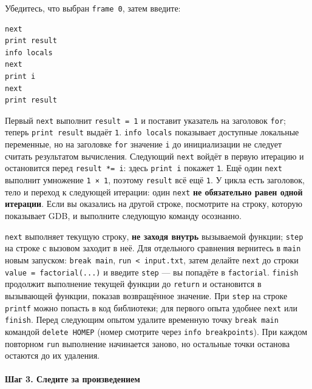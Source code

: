 Убедитесь, что выбран \texttt{frame\ 0}, затем введите:

\begin{verbatim}
next
print result
info locals
next
print i
next
print result
\end{verbatim}

Первый \texttt{next} выполнит \texttt{result\ =\ 1} и поставит указатель
на заголовок \texttt{for}; теперь \texttt{print\ result} выдаёт
\texttt{1}. \texttt{info\ locals} показывает доступные локальные
переменные, но на заголовке \texttt{for} значение \texttt{i} до
инициализации не следует считать результатом вычисления. Следующий
\texttt{next} войдёт в первую итерацию и остановится перед
\texttt{result\ *=\ i}: здесь \texttt{print\ i} покажет \texttt{1}. Ещё
один \texttt{next} выполнит умножение \texttt{1\ ×\ 1}, поэтому
\texttt{result} всё ещё \texttt{1}. У цикла есть заголовок, тело и
переход к следующей итерации: один \texttt{next} \textbf{не обязательно
равен одной итерации}. Если вы оказались на другой строке, посмотрите на
строку, которую показывает GDB, и выполните следующую команду осознанно.

\texttt{next} выполняет текущую строку, \textbf{не заходя внутрь}
вызываемой функции; \texttt{step} на строке с вызовом заходит в неё. Для
отдельного сравнения вернитесь в \texttt{main} новым запуском:
\texttt{break\ main}, \texttt{run\ \textless{}\ input.txt}, затем
делайте \texttt{next} до строки \texttt{value\ =\ factorial(...)} и
введите \texttt{step} --- вы попадёте в \texttt{factorial}.
\texttt{finish} продолжит выполнение текущей функции до \texttt{return}
и остановится в вызывающей функции, показав возвращённое значение. При
\texttt{step} на строке \texttt{printf} можно попасть в код библиотеки;
для первого опыта удобнее \texttt{next} или \texttt{finish}. Перед
следующим опытом удалите временную точку \texttt{break\ main} командой
\texttt{delete\ НОМЕР} (номер смотрите через
\texttt{info\ breakpoints}). При каждом повторном \texttt{run}
выполнение начинается заново, но остальные точки останова остаются до их
удаления.

\hypertarget{ux448ux430ux433-3-ux441ux43bux435ux434ux438ux442ux435-ux437ux430-ux43fux440ux43eux438ux437ux432ux435ux434ux435ux43dux438ux435ux43c}{%
\paragraph{Шаг 3. Следите за
произведением}\label{ux448ux430ux433-3-ux441ux43bux435ux434ux438ux442ux435-ux437ux430-ux43fux440ux43eux438ux437ux432ux435ux434ux435ux43dux438ux435ux43c}}

